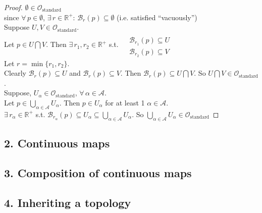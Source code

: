 \begin{proof}
	$\emptyset \in \mathcal{O}_{\text{standard}}$ \\
	since $\forall \, p \in \emptyset$, $\exists \, r \in \mathbb{R}^+$: $\mathcal{B}_r(p) \subseteq \emptyset$ (i.e. satisfied ``vacuously'') \\
	
	Suppose $U,V \in \mathcal{O}_{\text{standard}}$.  \\
	Let $p \in U \bigcap V$.  Then $\exists \, r_1, r_2 \in \mathbb{R}^+$ s.t. $\begin{aligned} & \quad \\
	& \mathcal{B}_{r_1}(p) \subseteq U \\
	& \mathcal{B}_{r_2}(p) \subseteq V \end{aligned}$ \\
	
	Let $r=\min{ \lbrace r_1, r_2 \rbrace}$.   \\
	Clearly $\mathcal{B}_r(p) \subseteq U$ and $\mathcal{B}_r(p) \subseteq V$.  Then $\mathcal{B}_r(p) \subseteq U \bigcap V$.  So $U\bigcap V \in \mathcal{O}_{\text{standard}}$.   \\
	
	Suppose, $U_{\alpha} \in \mathcal{O}_{\text{standard}}$, $\forall \, \alpha \in \mathcal{A}$.  \\
	Let $p \in \bigcup_{\alpha \in \mathcal{A}} U_{\alpha}$.  Then $p \in U_{\alpha}$ for at least 1 $\alpha \in \mathcal{A}$.  \\
	\phantom{ \quad \, } $\exists \, r_{\alpha} \in \mathbb{R}^+$ s.t. $\mathcal{B}_{r_{\alpha}}(p) \subseteq U_{\alpha} \subseteq \bigcup_{\alpha \in \mathcal{A}} U_{\alpha}$.  So $\bigcup_{\alpha \in \mathcal{A}} U_{\alpha} \in \mathcal{O}_{\text{standard}}$  
\end{proof}


\subsection{2. Continuous maps}

\subsection{3. Composition of continuous maps}

\subsection{4. Inheriting a topology}


